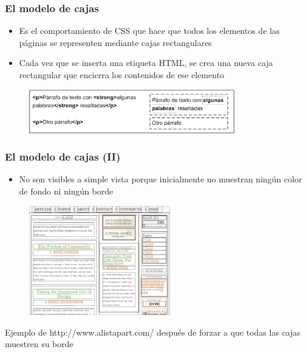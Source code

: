 \documentclass[ucs]{beamer}
\begin{document}
\begin{frame}
\frametitle{El modelo de cajas}

\begin{itemize}
  \item Es el comportamiento de CSS que hace que todos los elementos de las páginas se representen mediante cajas rectangulares
  \item  Cada vez que se inserta una etiqueta HTML, se crea una nueva caja rectangular que encierra los contenidos de ese elemento
\end{itemize}


\begin{center}
\begin{figure}[p]
\includegraphics[width=0.8\textwidth]{figs/f0402.png}
\end{figure}
\end{center}

\end{frame}


\begin{frame}
\frametitle{El modelo de cajas (II)}

\begin{itemize}
  \item No son visibles a simple vista porque inicialmente no muestran ningún color de fondo ni ningún borde
\end{itemize}

\begin{center}
\begin{figure}[p]
\includegraphics[width=0.55\textwidth]{figs/f0401.png}
\end{figure}
\end{center}
{\footnotesize
Ejemplo de http://www.alistapart.com/ después de forzar a que todas las cajas muestren su borde
}

\end{frame}
\end{document}
